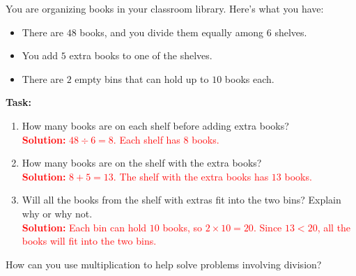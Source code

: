 \documentclass[11pt]{article}
\begin{document}
\begin{tcolorbox}[colframe=black!60, colback=white, 
coltitle=black, colbacktitle=black!15, fonttitle=\bfseries\Large, 
title=Performance Task: Organizing a Classroom Library, halign title=center, left=10pt, right=10pt, top=10pt, bottom=50pt]
You are organizing books in your classroom library. Here’s what you have:
\begin{itemize}
    \item There are \(48\) books, and you divide them equally among \(6\) shelves.
    \item You add \(5\) extra books to one of the shelves.
    \item There are \(2\) empty bins that can hold up to \(10\) books each.
\end{itemize}
\textbf{Task:}
\begin{enumerate}[itemsep=6em]
    \item How many books are on each shelf before adding extra books?\\
    \textcolor{red}{\textbf{Solution:} \(48 \div 6 = 8\). Each shelf has \(8\) books.}

    \item How many books are on the shelf with the extra books?\\
    \textcolor{red}{\textbf{Solution:} \(8 + 5 = 13\). The shelf with the extra books has \(13\) books.}

    \item Will all the books from the shelf with extras fit into the two bins? Explain why or why not.\\
    \textcolor{red}{\textbf{Solution:} Each bin can hold \(10\) books, so \(2 \times 10 = 20\). Since \(13 < 20\), all the books will fit into the two bins.}
\end{enumerate}
\end{tcolorbox}

\begin{tcolorbox}[colframe=black!60, colback=white, 
coltitle=black, colbacktitle=black!15, fonttitle=\bfseries\Large, 
title=Reflection, halign title=center, left=10pt, right=10pt, top=10pt, bottom=100pt]
{How can you use multiplication to help solve problems involving division?}
\end{tcolorbox}
\end{document}
